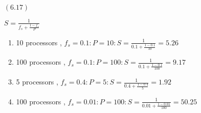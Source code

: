 \documentclass[letterpaper,10pt,titlepage]{article}
\begin{document}
\begin{enumerate}
\item[$(6.17)$]

$ S = \frac{1}{f_{s} + \frac{1-f_{s}}{P}} $ \\ 
\begin{enumerate}
\item 10 processors , $f_{s} = 0.1: P = 10 : S =  \frac{1}{0.1 + \frac{1-0.1}{10}} = 5.26$
\item 100 processors , $f_{s} = 0.1: P = 100 : S =  \frac{1}{0.1 + \frac{1-0.1}{100}} = 9.17$
\item 5 processors , $f_{s} = 0.4: P = 5 : S =  \frac{1}{0.4 + \frac{1-0.4}{5}} = 1.92$
\item 100 processors , $f_{s} = 0.01: P = 100 : S =  \frac{1}{0.01 + \frac{1-0.01}{100}} = 50.25$
\end{enumerate}



\end{enumerate}
\end{document}
